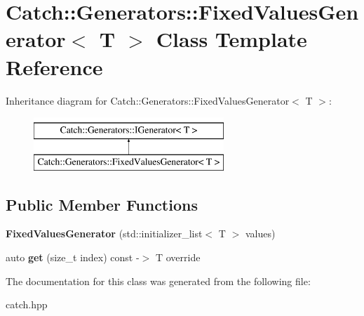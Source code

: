 \hypertarget{class_catch_1_1_generators_1_1_fixed_values_generator}{}\section{Catch\+:\+:Generators\+:\+:Fixed\+Values\+Generator$<$ T $>$ Class Template Reference}
\label{class_catch_1_1_generators_1_1_fixed_values_generator}
Inheritance diagram for Catch\+:\+:Generators\+:\+:Fixed\+Values\+Generator$<$ T $>$\+:\begin{figure}[H]
\begin{center}
\leavevmode
\includegraphics[height=2.000000cm]{class_catch_1_1_generators_1_1_fixed_values_generator}
\end{center}
\end{figure}
\subsection*{Public Member Functions}
\begin{DoxyCompactItemize}
\item 
\mbox{\label{class_catch_1_1_generators_1_1_fixed_values_generator_a6e9f473655413c1cb15f079890f06b86}} 
{\bfseries Fixed\+Values\+Generator} (std\+::initializer\+\_\+list$<$ T $>$ values)
\item 
\mbox{\label{class_catch_1_1_generators_1_1_fixed_values_generator_a3ed654a5860c170dbe7b01487b83253d}} 
auto {\bfseries get} (size\+\_\+t index) const -\/$>$ T override
\end{DoxyCompactItemize}


The documentation for this class was generated from the following file\+:\begin{DoxyCompactItemize}
\item 
catch.\+hpp\end{DoxyCompactItemize}
